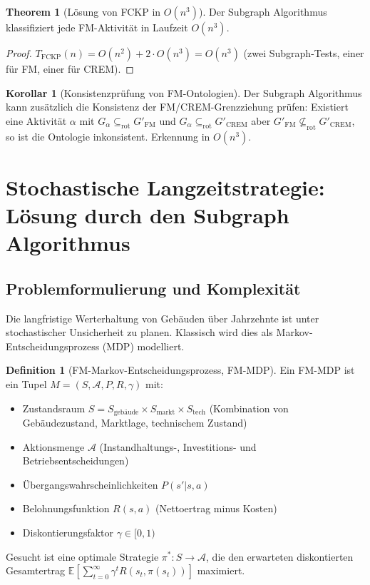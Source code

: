 ﻿\documentclass[a4paper,12pt]{article}
\theoremstyle{definition}
\newtheorem{definition}{Definition}[section]
\newtheorem{korollar}{Korollar}[section]
\newtheorem{theorem}{Theorem}[section]
\begin{document}
\begin{theorem}[Lösung von FCKP in $O(n^3)$]
\label{thm:fckp-sol}
Der Subgraph Algorithmus klassifiziert jede FM-Aktivität in Laufzeit $O(n^3)$.
\end{theorem}

\begin{proof}
$T_{\mathrm{FCKP}}(n) = O(n^2) + 2 \cdot O(n^3) = O(n^3)$
(zwei Subgraph-Tests, einer für FM, einer für CREM).
\end{proof}

\begin{korollar}[Konsistenzprüfung von FM-Ontologien]
\label{kor:onto-konsistenz}
Der Subgraph Algorithmus kann zusätzlich die Konsistenz der FM/CREM-Grenzziehung
prüfen: Existiert eine Aktivität $\alpha$ mit $G_{\alpha} \subseteq_{\mathrm{rot}} G'_{\mathrm{FM}}$
und $G_{\alpha} \subseteq_{\mathrm{rot}} G'_{\mathrm{CREM}}$ aber $G'_{\mathrm{FM}} \not\subseteq_{\mathrm{rot}} G'_{\mathrm{CREM}}$,
so ist die Ontologie inkonsistent. Erkennung in $O(n^3)$.
\end{korollar}

\section{Stochastische Langzeitstrategie: Lösung durch den Subgraph Algorithmus}
\label{sec:mdp}

\subsection{Problemformulierung und Komplexität}

Die langfristige Werterhaltung von Gebäuden über Jahrzehnte ist unter
stochastischer Unsicherheit zu planen. Klassisch wird dies als Markov-Entscheidungsprozess
(MDP) modelliert.

\begin{definition}[FM-Markov-Entscheidungsprozess, FM-MDP]
\label{def:fmmdp}
Ein FM-MDP ist ein Tupel $M = (S, \mathcal{A}, P, R, \gamma)$ mit:
\begin{itemize}
    \item Zustandsraum $S = S_{\text{gebäude}} \times S_{\text{markt}} \times S_{\text{tech}}$
          (Kombination von Gebäudezustand, Marktlage, technischem Zustand)
    \item Aktionsmenge $\mathcal{A}$ (Instandhaltungs-, Investitions- und Betriebsentscheidungen)
    \item Übergangswahrscheinlichkeiten $P(s' | s, a)$
    \item Belohnungsfunktion $R(s, a)$ (Nettoertrag minus Kosten)
    \item Diskontierungsfaktor $\gamma \in [0,1)$
\end{itemize}
Gesucht ist eine optimale Strategie $\pi^*: S \to \mathcal{A}$, die den erwarteten
diskontierten Gesamtertrag $\mathbb{E}[\sum_{t=0}^{\infty} \gamma^t R(s_t, \pi(s_t))]$
maximiert.
\end{definition}
\end{document}
